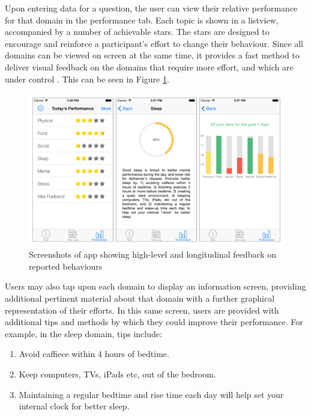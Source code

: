 Upon entering data for a question, the user can view their relative performance for that domain in the performance tab. Each topic is shown in a listview, accompanied by a number of achievable stars. The stars are designed to encourage and reinforce a participant’s effort to change their behaviour. Since all domains can be viewed on screen at the same time, it provides a fast method to deliver visual feedback on the domains that require more effort, and which are under control \cite{Hartin2015-JMIR}. This can be seen in Figure \ref{fig: screenshot-performance}.
\begin{figure}[h]
    \centering
    \includegraphics[scale=0.2, angle=0]{Files/prevention-study-1/figures/screenshot-feedback.png}
    \caption{Screenshots of app showing high-level and longitudinal feedback on reported behaviours}
    \label{fig: screenshot-performance}
\end{figure}

Users may also tap upon each domain to display an information screen, providing additional pertinent material about that domain with a further graphical representation of their efforts. In this same screen, users are provided with additional tips and methods by which they could improve their performance. For example, in the sleep domain, tips include:
\begin{enumerate}[noitemsep,topsep=0pt]
\item Avoid caffiece within 4 hours of bedtime.
\item Keep computers, TVs, iPads etc, out of the bedroom.
\item Maintaining a regular bedtime and rise time each day will help set your internal clock for better sleep.
\end{enumerate}

